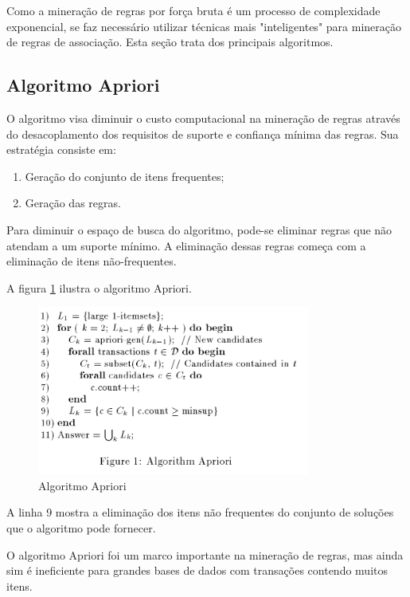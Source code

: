 \documentclass[12pt]{article}
\begin{document}
Como a mineração de regras por força bruta é um processo de complexidade
exponencial, se faz necessário utilizar técnicas mais "inteligentes" para
mineração de regras de associação. Esta seção trata dos principais algoritmos.

\subsection{Algoritmo Apriori}

O algoritmo visa diminuir o custo computacional na mineração de regras através
do desacoplamento dos requisitos de suporte e confiança mínima das regras. Sua
estratégia consiste em:

\begin{enumerate}
    \item Geração do conjunto de itens frequentes;
    \item Geração das regras.
\end{enumerate}

Para diminuir o espaço de busca do algoritmo, pode-se eliminar regras que não
atendam a um suporte mínimo. A eliminação dessas regras começa com a eliminação
de itens não-frequentes. 

A figura \ref{fig:apriori} ilustra o algoritmo Apriori.

\begin{figure}[H]
    \centering
    \includegraphics[width=0.8\textwidth]{apriori.png}
    \caption{Algoritmo Apriori \cite{agrawal}}
    \label{fig:apriori}
\end{figure}

A linha 9 mostra a eliminação dos itens não frequentes do conjunto de soluções
que o algoritmo pode fornecer.

O algoritmo Apriori foi um marco importante na mineração de regras, mas ainda
sim é ineficiente para grandes bases de dados com transações contendo muitos
itens.
\end{document}
